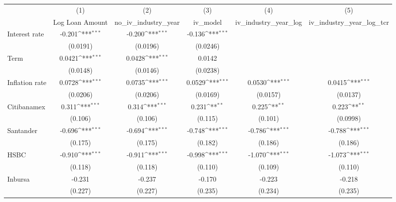 {
\def\sym#1{\ifmmode^{#1}\else\(^{#1}\)\fi}
\begin{tabular}{l*{5}{c}}
\hline\hline
                &\multicolumn{1}{c}{(1)}&\multicolumn{1}{c}{(2)}&\multicolumn{1}{c}{(3)}&\multicolumn{1}{c}{(4)}&\multicolumn{1}{c}{(5)}\\
                &\multicolumn{1}{c}{Log Loan Amount}&\multicolumn{1}{c}{no_iv_industry_year}&\multicolumn{1}{c}{iv_model}&\multicolumn{1}{c}{iv_industry_year_log}&\multicolumn{1}{c}{iv_industry_year_log_tcr}\\
\hline
Interest rate   &   -0.201\sym{***}&   -0.200\sym{***}&   -0.136\sym{***}&                  &                  \\
                & (0.0191)         & (0.0196)         & (0.0246)         &                  &                  \\
Term            &   0.0421\sym{***}&   0.0428\sym{***}&   0.0142         &                  &                  \\
                & (0.0148)         & (0.0146)         & (0.0238)         &                  &                  \\
Inflation rate  &   0.0728\sym{***}&   0.0735\sym{***}&   0.0529\sym{***}&   0.0530\sym{***}&   0.0415\sym{***}\\
                & (0.0206)         & (0.0206)         & (0.0169)         & (0.0157)         & (0.0137)         \\
Citibanamex     &    0.311\sym{***}&    0.314\sym{***}&    0.231\sym{**} &    0.225\sym{**} &    0.223\sym{**} \\
                &  (0.106)         &  (0.106)         &  (0.115)         &  (0.101)         & (0.0998)         \\
Santander       &   -0.696\sym{***}&   -0.694\sym{***}&   -0.748\sym{***}&   -0.786\sym{***}&   -0.788\sym{***}\\
                &  (0.175)         &  (0.175)         &  (0.182)         &  (0.186)         &  (0.186)         \\
HSBC            &   -0.910\sym{***}&   -0.911\sym{***}&   -0.998\sym{***}&   -1.070\sym{***}&   -1.073\sym{***}\\
                &  (0.118)         &  (0.118)         &  (0.110)         &  (0.109)         &  (0.110)         \\
Inbursa         &   -0.231         &   -0.237         &   -0.170         &   -0.223         &   -0.218         \\
                &  (0.227)         &  (0.227)         &  (0.235)         &  (0.234)         &  (0.235)         \\

\end{tabular}}
